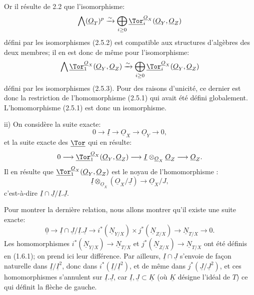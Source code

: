
Or il
résulte de 2.2 que l'isomorphisme:
\[
\bigwedge(\underline{O}_T)^p\xrightarrow{\sim}
\bigoplus_{i\ge0}\underline{\Tor}_i^{\underline{O}_X}(\underline{O}_Y,\underline{O}_Z)
\]
défini par les isomorphismes (2.5.2) est compatible aux structures d'algèbres des deux membres; il en est donc de même pour l'isomorphisme:
\[
\bigwedge\underline{\Tor}_1^{\underline{O}_X}(\underline{O}_Y,\underline{O}_Z)\xrightarrow{\sim}
\bigoplus_{i\ge0}\underline{\Tor}_i^{\underline{O}_X}(\underline{O}_Y,\underline{O}_Z)
\]
défini par les isomorphismes (2.5.3). Pour des raisons d'unicité, ce dernier est donc la restriction de l'homomorphisme (2.5.1) qui avait été défini globalement. L'homomorphisme (2.5.1) est donc un isomorphisme.

ii) On considère la suite exacte:
\[
0\longrightarrow \underline{I}\longrightarrow \underline{O}_X\longrightarrow \underline{O}_Y\longrightarrow0,
\]
et la suite exacte des \(\underline{\Tor}\) qui en résulte:
\[
0\longrightarrow\underline{\Tor}_1^{\underline{O}_X}(\underline{O}_Y,\underline{O}_Z)
\longrightarrow \underline{I}\otimes_{\underline{O}_X}\underline{O}_Z
\longrightarrow \underline{O}_Z.
\]
Il en résulte que \(\underline{\Tor}_1^{\underline{O}_X}(\underline{O}_Y,\underline{O}_Z)\) est le noyau de l'homomorphisme :
\[
\underline{I}\otimes_{\underline{O}_X}(\underline{O}_X/\underline{J})\longrightarrow \underline{O}_X/J,
\]
c'est-à-dire \(\underline{I}\cap \underline{J}/\underline{I}.\underline{J}\).

Pour montrer la dernière relation, nous allons montrer qu'il existe une suite exacte:
\[
\underline{0}\longrightarrow \underline{I}\cap \underline{J}/\underline{I}.\underline{J}
\longrightarrow i^*(\underline{N}_{Y/X})\times j^*(\underline{N}_{Z/X})
\longrightarrow \underline{N}_{T/X}\longrightarrow0.
\]
Les homomorphismes \(i^*(\underline{N}_{Y/X})\to \underline{N}_{T/X}\) et \(j^*(\underline{N}_{Z/X})\to \underline{N}_{T/X}\) ont été définis en (1.6.1); on prend ici leur différence. Par ailleurs, \(\underline{I}\cap \underline{J}\) s'envoie de façon naturelle dans \(\underline{I}/\underline{I}^2\), donc dans \(i^*(\underline{I}/\underline{I}^2)\), et de même dans \(j^*(\underline{J}/\underline{J}^2)\), et ces homomorphismes s'annulent sur \(\underline{I}.\underline{J}\), car \(\underline{I},\underline{J}\subset \underline{K}\) (où \(\underline{K}\) désigne l'idéal de \(T\)) ce qui définit la flèche de gauche.


